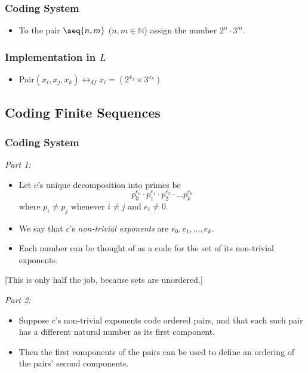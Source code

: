 \documentclass[12pt]{extarticle}
\begin{document}
\subsubsection*{Coding System}

\begin{itemize}
\item To the pair $\seq{n,m}$ ($n,m \in \mathbb{N}$) assign the number $2^n \cdot 3^m$.
\end{itemize}

\subsubsection*{Implementation in $L$}


\begin{itemize}
\item $\mbox{Pair}(x_i,x_j,x_k) \leftrightarrow_{df} x_i=(2^{x_j}\times 3^{x_k})$
\end{itemize}











\subsection{Coding Finite Sequences}


\subsubsection*{Coding System}

\emph{Part 1:}
\begin{itemize}
\item Let $c$'s unique decomposition into primes be 
$$p_0^{e_0} \cdot p_1^{e_1} \cdot p_2^{e_2} \cdot \ldots p_k^{e_k}$$
where $p_i \neq p_j$ whenever $i \neq j$ and $e_i \neq 0$.


\item We say that $c$'s \emph{non-trivial exponents} are $e_0, e_1, \dots, e_k$.


\item Each number can be thought of as a code for the set of its non-trivial exponents.
\end{itemize}
[This is only half the job, because sets are unordered.]

\vspace{8mm}
\noindent
\emph{Part 2:}
\begin{itemize}
\item Suppose $c$'s non-trivial exponents code {ordered pairs}, and that each such pair has a different natural number as its first component. 

\item Then the first components of the pairs can be used to define an ordering of the pairs' second components.


\end{itemize}
\end{document}
